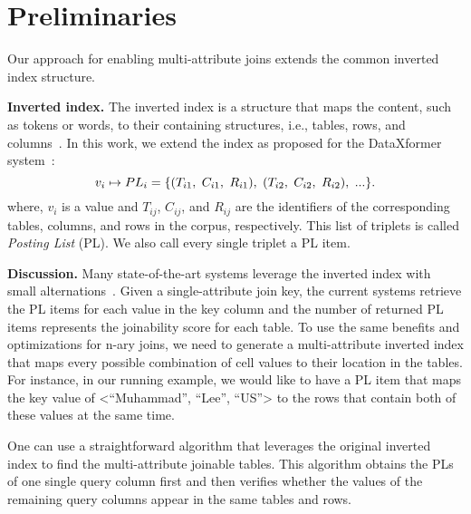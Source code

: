 \section{Preliminaries}\label{sec:preliminaries} 
Our approach for enabling multi-attribute joins extends the common inverted index structure.

\textbf{Inverted index.} The inverted index is a structure that maps the content, such as tokens or words, to their containing structures, i.e., tables, rows, and columns~\cite{fernandez2018aurum, abedjan2015dataxformer}. In this work, we extend the index as proposed for the DataXformer system~\cite{abedjan2015dataxformer}: 
\newline
\begin{equation} \label{eq_conventional_inverted_index}
\small
    v_i \mapsto PL_i = \{ (T_{i1},\ C_{i1},\ R_{i1}),\ (T_{i2},\ C_{i2},\ R_{i2}),\ ... \}.
\end{equation}
\newline
where, $v_{i}$ is a value and $T_{ij}$, $C_{ij}$, and $R_{ij}$ are the identifiers of the corresponding tables, columns, and rows in the corpus, respectively. This list of triplets is called \textit{Posting List} (PL). We also call every single triplet a PL item.

\textbf{Discussion. } 
Many state-of-the-art systems leverage the inverted index with small alternations~\cite{zhu2019josie,xiao2009top,chaudhuri2006primitive}.
Given a single-attribute join key, the current systems retrieve the PL items for each value in the key column and the number of returned PL items represents the joinability score for each table.
To use the same benefits and optimizations for n-ary joins, we need to generate a multi-attribute inverted index that maps every possible combination of cell values to their location in the tables. For instance, in our running example, we would like to have a PL item that maps the key value of <``Muhammad'', ``Lee'', ``US''> to the rows that contain both of these values at the same time.

One can use a straightforward algorithm that leverages the original inverted index to find the multi-attribute joinable tables. This algorithm obtains the PLs of one single query column first and then verifies whether the values of the remaining query columns appear in the same tables and rows.

